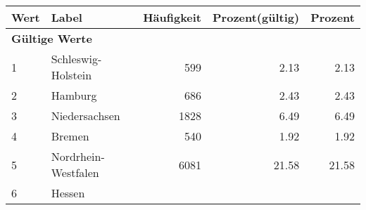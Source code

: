      \begin{longtable}{lXrrr}
     \toprule
     \textbf{Wert} & \textbf{Label} & \textbf{Häufigkeit} & \textbf{Prozent(gültig)} & \textbf{Prozent} \\
     \endhead
     \midrule
     \multicolumn{5}{l}{\textbf{Gültige Werte}}\\

     1 &
     \multicolumn{1}{X}{ Schleswig-Holstein   } &


       \num{599} &
       \num[round-mode=places,round-precision=2]{2.13} &
         \num[round-mode=places,round-precision=2]{2.13} \\

     2 &
     \multicolumn{1}{X}{ Hamburg   } &


       \num{686} &
       \num[round-mode=places,round-precision=2]{2.43} &
         \num[round-mode=places,round-precision=2]{2.43} \\

     3 &
     \multicolumn{1}{X}{ Niedersachsen   } &


       \num{1828} &
       \num[round-mode=places,round-precision=2]{6.49} &
         \num[round-mode=places,round-precision=2]{6.49} \\

     4 &
     \multicolumn{1}{X}{ Bremen   } &


       \num{540} &
       \num[round-mode=places,round-precision=2]{1.92} &
         \num[round-mode=places,round-precision=2]{1.92} \\

     5 &
     \multicolumn{1}{X}{ Nordrhein-Westfalen   } &


       \num{6081} &
       \num[round-mode=places,round-precision=2]{21.58} &
         \num[round-mode=places,round-precision=2]{21.58} \\

     6 &
     \multicolumn{1}{X}{ Hessen   } &



\end{longtable}
